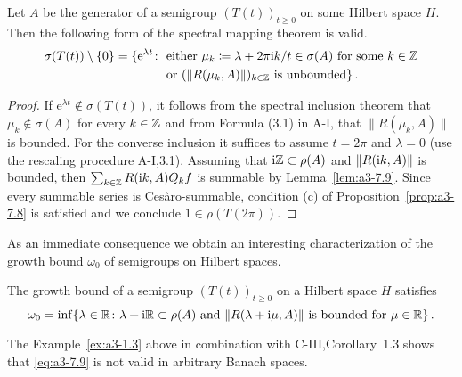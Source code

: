 \begin{theorem}\label{thm:a3-7.10}
Let $A$ be the generator of a semigroup $(T(t))_{t\geq 0}$ on some Hilbert space $H$.
Then the following form of the spectral mapping theorem is valid.
\begin{align*}
\sigma(T(t))\setminus\{0\} = \{\mathrm{e}^{\lambda t} \colon
& \text{ either } \mu_{k}\coloneqq \lambda + 2\pi\mathrm{i}  k/t \in \sigma(A) \text{ for some } k \in \mathbb{Z}\\
& \text{ or } (\|R(\mu_{k},A)\|)_{k\in\mathbb{Z}} \text{ is unbounded}\}\,.
\end{align*}
\end{theorem}
\begin{proof}
If $\mathrm{e}^{\lambda t} \not\in \sigma(T(t))$, it follows from the spectral inclusion theorem that $\mu_{k} \not\in \sigma(A)$ for every $k \in \mathbb{Z}$ and from Formula (3.1) in A-I, that $\|R(\mu_{k},A)\|$ is bounded.
For the converse inclusion it suffices to assume $t = 2\pi$ and $\lambda = 0$ (use the rescaling procedure A-I,3.1).
Assuming that $\mathrm{i}\mathbb{Z} \subset \rho(A)$ and $\|R(\mathrm{i} k,A)\|$ is bounded, then $\sum_{k\in\mathbb{Z}} R(\mathrm{i} k,A)Q_{k}f$ is summable by Lemma~\ref{lem:a3-7.9}.
Since every summable series is Cesàro-summable, condition (c) of Proposition~\ref{prop:a3-7.8} is satisfied and we conclude $1 \in \rho(T(2\pi))$.
\end{proof}
As an immediate consequence we obtain an interesting characterization of the growth bound $\omega_{0}$ of semigroups on Hilbert spaces.
\begin{corollary}\label{cor:a3-7.11}
The growth bound of a semigroup $(T(t))_{t\geq 0}$ on a Hilbert space $H$ satisfies
\begin{equation}\label{eq:a3-7.9}
\omega_{0} = \inf \{\lambda \in \mathbb{R} \colon \lambda + \mathrm{i}\mathbb{R} \subset \rho(A) \text{ and } \|R(\lambda+\mathrm{i}\mu,A)\| \text{ is bounded for } \mu \in \mathbb{R}\}\,.
\end{equation}
\end{corollary}
The Example~\ref{ex:a3-1.3} above in combination with C-III,Corollary~1.3 shows that \eqref{eq:a3-7.9} is not valid in arbitrary Banach spaces.
